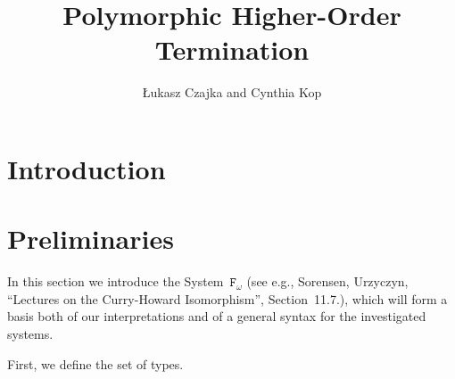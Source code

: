 \documentclass[runningheads,a4paper]{llncs}
\newcommand{\Fomega}{\mathtt{F}_\omega}
\begin{document}
\mainmatter

\title{Polymorphic Higher-Order Termination}

\author{{\L}ukasz Czajka and Cynthia Kop}

\maketitle

\begin{abstract}
\end{abstract}

\section{Introduction}

\section{Preliminaries}\label{sec_preliminaries}

In this section we introduce the System~$\Fomega$ (see e.g.,
Sorensen, Urzyczyn, ``Lectures on the Curry-Howard Isomorphism'',
Section~11.7.), which will form a basis both of our interpretations
and of a general syntax for the investigated systems.

First, we define the set of types.
\end{document}
